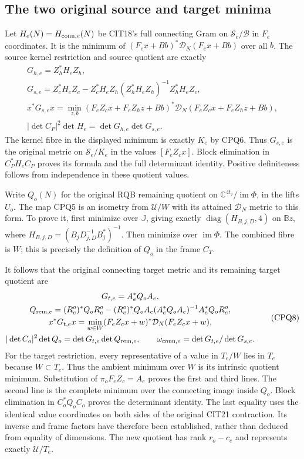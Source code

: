 \documentclass[11pt,a4paper]{article}
\begin{document}
\subsection{The two original source and target minima}
Let $H_e(N)=H_{{\rm conn},e}(N)$ be CIT18's full connecting Gram
on $\mathscr S_e/\mathscr B$ in $F_e$ coordinates. It is the minimum
of $(F_ex+Bb)^*\mathcal D_N(F_ex+Bb)$ over all $b$.
The source kernel restriction and source quotient are exactly
\[
 \begin{gathered}
 G_{h,e}=Z_h^*H_eZ_h,\\
 G_{s,e}=Z_c^*H_eZ_c-Z_c^*H_eZ_h
                    (Z_h^*H_eZ_h)^{-1}Z_h^*H_eZ_c,\\
 x^*G_{s,e}x=\min_{z,b}
 (F_eZ_cx+F_eZ_hz+Bb)^*\mathcal D_N
                         (F_eZ_cx+F_eZ_hz+Bb),\\
 |\det C_P|^2\det H_e=\det G_{h,e}\det G_{s,e}.
 \end{gathered}\tag{CPQ7}
\]
The kernel fibre in the displayed minimum is exactly $K_e$ by
CPQ6. Thus $G_{s,e}$ is the original metric on $\mathscr S_e/K_e$
in the values $[F_eZ_cx]$. Block elimination in $C_P^*H_eC_P$
proves its formula and the full determinant identity. Positive
definiteness follows from independence in these quotient values.

Write $Q_o(N)$ for the original RQB remaining quotient on
$\mathbb C^{4t_j}/\operatorname{im}\Phi$, in the lifts $U_o$.
The map CPQ5 is an isometry from $\mathcal U/W$ with its attained
$\mathcal D_N$ metric to this form. To prove it, first minimize
over $\mathbb J$, giving exactly
$\operatorname{diag}(H_{B,j,D},4)$ on $\mathbb Bz$, where
$H_{B,j,D}=(B_jD_{j,D}^{-1}B_j^*)^{-1}$. Then minimize over
$\operatorname{im}\Phi$. The combined fibre is $W$; this is
precisely the definition of $Q_o$ in the frame $C_T$.

It follows that the original connecting target metric and its
remaining target quotient are
\[
 \begin{gathered}
 G_{t,e}=A_e^*Q_oA_e,\\
 Q_{{\rm rem},e}=(R_e^o)^*Q_oR_e^o-(R_e^o)^*Q_oA_e
                 (A_e^*Q_oA_e)^{-1}A_e^*Q_oR_e^o,\\
 x^*G_{t,e}x=\min_{w\in W}
       (F_eZ_cx+w)^*\mathcal D_N(F_eZ_cx+w),\\
 |\det C_o|^2\det Q_o=\det G_{t,e}\det Q_{{\rm rem},e},
 \qquad \omega_{{\rm conn},e}=\det G_{t,e}/\det G_{s,e}.
 \end{gathered}\tag{CPQ8}
\]
For the target restriction, every representative of a value in
$T_e/W$ lies in $T_e$ because $W\subset T_e$. Thus the ambient
minimum over $W$ is its intrinsic quotient minimum. Substitution
of $\pi_oF_eZ_c=A_e$ proves the first and third lines. The second
line is the complete minimum over the connecting image inside
$Q_o$. Block elimination in $C_o^*Q_oC_o$ proves the determinant
identity. The last equality uses the identical value coordinates
on both sides of the original CIT21 contraction. Its inverse and
frame factors have therefore been established, rather than
deduced from equality of dimensions. The new quotient has rank
$r_o-c_e$ and represents exactly $\mathcal U/T_e$.
\end{document}
